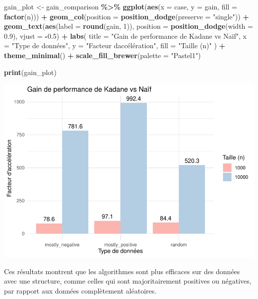 \documentclass[
]{article}
\newenvironment{Shaded}{\begin{snugshade}}{\end{snugshade}}
\newcommand{\AttributeTok}[1]{\textcolor[rgb]{0.13,0.29,0.53}{#1}}
\newcommand{\DecValTok}[1]{\textcolor[rgb]{0.00,0.00,0.81}{#1}}
\newcommand{\FloatTok}[1]{\textcolor[rgb]{0.00,0.00,0.81}{#1}}
\newcommand{\FunctionTok}[1]{\textcolor[rgb]{0.13,0.29,0.53}{\textbf{#1}}}
\newcommand{\NormalTok}[1]{#1}
\newcommand{\OtherTok}[1]{\textcolor[rgb]{0.56,0.35,0.01}{#1}}
\newcommand{\SpecialCharTok}[1]{\textcolor[rgb]{0.81,0.36,0.00}{\textbf{#1}}}
\newcommand{\StringTok}[1]{\textcolor[rgb]{0.31,0.60,0.02}{#1}}
\begin{document}
\begin{Shaded}
\begin{Highlighting}[]
\NormalTok{gain\_plot }\OtherTok{\textless{}{-}}\NormalTok{ gain\_comparison }\SpecialCharTok{\%\textgreater{}\%}
  \FunctionTok{ggplot}\NormalTok{(}\FunctionTok{aes}\NormalTok{(}\AttributeTok{x =}\NormalTok{ case, }\AttributeTok{y =}\NormalTok{ gain, }\AttributeTok{fill =} \FunctionTok{factor}\NormalTok{(n))) }\SpecialCharTok{+}
  \FunctionTok{geom\_col}\NormalTok{(}\AttributeTok{position =} \FunctionTok{position\_dodge}\NormalTok{(}\AttributeTok{preserve =} \StringTok{"single"}\NormalTok{)) }\SpecialCharTok{+}
  \FunctionTok{geom\_text}\NormalTok{(}\FunctionTok{aes}\NormalTok{(}\AttributeTok{label =} \FunctionTok{round}\NormalTok{(gain, }\DecValTok{1}\NormalTok{)), }
            \AttributeTok{position =} \FunctionTok{position\_dodge}\NormalTok{(}\AttributeTok{width =} \FloatTok{0.9}\NormalTok{),}
            \AttributeTok{vjust =} \SpecialCharTok{{-}}\FloatTok{0.5}\NormalTok{) }\SpecialCharTok{+}
  \FunctionTok{labs}\NormalTok{(}
    \AttributeTok{title =} \StringTok{"Gain de performance de Kadane vs Naïf"}\NormalTok{,}
    \AttributeTok{x =} \StringTok{"Type de données"}\NormalTok{,}
    \AttributeTok{y =} \StringTok{"Facteur d\textquotesingle{}accélération"}\NormalTok{,}
    \AttributeTok{fill =} \StringTok{"Taille (n)"}
\NormalTok{  ) }\SpecialCharTok{+}
  \FunctionTok{theme\_minimal}\NormalTok{() }\SpecialCharTok{+}
  \FunctionTok{scale\_fill\_brewer}\NormalTok{(}\AttributeTok{palette =} \StringTok{"Pastel1"}\NormalTok{)}

\FunctionTok{print}\NormalTok{(gain\_plot)}
\end{Highlighting}
\end{Shaded}

\includegraphics{MaxSubarray1D_files/figure-latex/unnamed-chunk-16-1.pdf}

Ces résultats montrent que les algorithmes sont plus efficaces sur des
données avec une structure, comme celles qui sont majoritairement
positives ou négatives, par rapport aux données complètement aléatoires.
\end{document}

